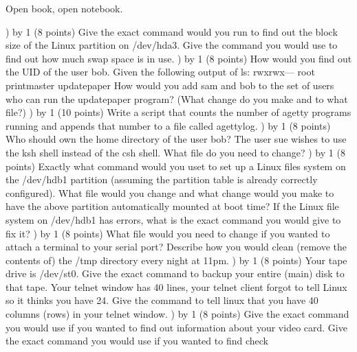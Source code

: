 
\parindent=0in
\nopagenumbers
\newcount\quesno
{}
\def\ques{\number\quesno) \advance\quesno by 1}
\def\aspace{\vskip 1.5in}

Open book, open notebook.

\ques
(8 points)
Give the exact command would you run to find out the block size of the Linux
partition on {\ltt{}/dev/hda3}.
\vskip 1.0in
Give the command you would use to find out how much swap space is in use.
\vskip 0.8in
\ques
(8 points)
How would you find out the UID of the user {\ltt{}bob}.
\vskip 0.5in
Given the following output of ls:
\hfill\break
{\ltt{}rwxrwx---  root printmaster   updatepaper}
\hfill\break
How would you add {\ltt{}sam} and {\ltt{}bob} to the set of users who
can run the {\ltt{}updatepaper} program?
(What change do you make and to what file?)
\vskip 1.0in
\ques
(10 points)
Write a script that counts the number of {\ltt{}agetty} programs running
and appends that number to a file called {\ltt{}agettylog}.
\vfill\eject
\ques
(8 points)
Who should own the home directory of the user {\ltt{}bob}?
\vskip 0.8in
The user {\ltt{}sue} wishes to use the {\ltt{}ksh} shell instead of 
the {\ltt{}csh} shell.
What file do you need to change?
\vskip 0.8in
\ques
(8 points)
Exactly what command would you uset to set up a Linux files system on the
{\ltt{}/dev/hdb1} partition (assuming the partition table is already
correctly configured).
\vskip 0.8in
What file would you change and what change would you make to
have the above partition automatically mounted at boot time?
\vskip 1.0in
If the Linux file system on {\ltt{}/dev/hdb1} has errors,
what is the exact command you would give to fix it?
\vskip 1.0in
\ques
(8 points)
What file would you need to change if you wanted to attach
a terminal to your serial port?
\vskip 0.5in
Describe how you would clean (remove the contents of) the {\ltt{}/tmp}
directory every night at 11pm.
\vfill\eject
\ques
(8 points)
Your tape drive is {\ltt{}/dev/st0}.
Give the exact command to backup your entire (main) disk to that tape.
\vskip 0.5in
Your telnet window has 40 lines, your telnet client forgot to
tell Linux so it thinks you have 24.
Give the command to tell linux that you have 40 columns ({\ltt{}rows})
in your telnet window.
\vskip 0.5in
\ques
(8 points)
Give the exact command you would use if you wanted to find out 
information about your video card.
\vskip 0.5in
Give the exact command you would use if you wanted to find check 
